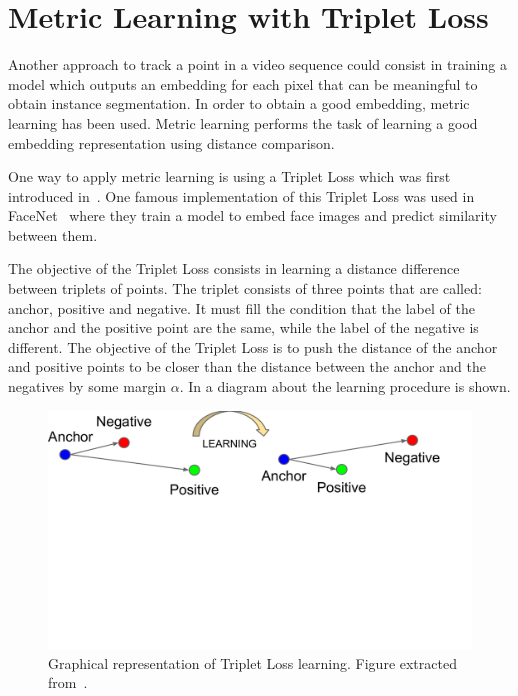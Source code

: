 \section{Metric Learning with Triplet Loss}
\label{sec:methods:metriclearning}

Another approach to track a point in a video sequence could consist in training a model which outputs an embedding for each pixel that can be meaningful to obtain instance segmentation.
In order to obtain a good embedding, metric learning has been used.
Metric learning performs the task of learning a good embedding representation using distance comparison.

One way to apply metric learning is using a Triplet Loss which was first introduced in~\metriclearning{}.
One famous implementation of this Triplet Loss was used in FaceNet~\facenet{} where they train a model to embed face images and predict similarity between them.

The objective of the Triplet Loss consists in learning a distance difference between triplets of points.
The triplet consists of three points that are called: anchor, positive and negative.
It must fill the condition that the label of the anchor and the positive point are the same, while the label of the negative is different.
The objective of the Triplet Loss is to push the distance of the anchor and positive points to be closer than the distance between the anchor and the negatives by some margin $\alpha$.
In  a diagram about the learning procedure is shown.

\begin{figure}[h]
  \centering
  \includegraphics[trim=0cm 9cm 1.5cm 0cm, clip, width=0.7\linewidth]{figures/methods/triplet_loss/triplet_viz.pdf}
  \caption{
    Graphical representation of Triplet Loss learning.
  Figure extracted from~\facenet{}. }
    \label{fig:tripletloss:visualization}
\end{figure}

